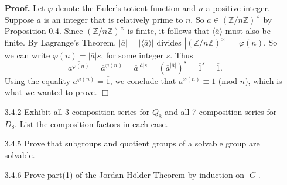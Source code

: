 \documentclass[9pt]{article}
\newcommand{\qed}{\hfill \ensuremath{\Box}}
\newcommand{\cyc}[1]{\langle #1 \rangle}
\newcommand{\Z}{\mathbb{Z}}
\begin{document}
\begin{enumerate}
      \textbf{Proof.} Let $\varphi$ denote the Euler's totient function and $n$
      a positive integer. Suppose $a$ is an integer that is relatively prime to
      $n$. So $\overline{a} \in (\Z/n\Z)^\times$ by Proposition 0.4. Since
      $(\Z/n\Z)^\times$ is finite, it follows that $\cyc{\overline{a}}$ must
      also be finite. By Lagrange's Theorem,
      $|\overline{a}| = |\cyc{\overline{a}}|$ divides
      $|(\Z/n\Z)^\times| = \varphi(n)$. So we can write
      $\varphi(n) = |\overline{a}|s$, for some integer $s$. Thus
      $$\overline{a^{\varphi(n)}} = \overline{a}^{\varphi(n)} =
        \overline{a}^{|\overline{a}|s} = (\overline{a}^{|\overline{a}|})^s =
        \overline{1}^s = \overline{1}.$$
      Using the equality $\overline{a^{\varphi(n)}} = \overline{1}$,
      we conclude that $a^{\varphi(n)} \equiv 1$ (mod $n$), which is what we
      wanted to prove. \qed
   \item[3.4.2]   Exhibit all 3 composition series for $Q_8$ and all 7 
                  composition series for $D_8$. List the composition factors in
                  each case.
   \item[3.4.5]   Prove that subgroups and quotient groups of a solvable group
                  are solvable.
   \item[3.4.6]   Prove part(1) of the Jordan-H\"{o}lder Theorem by induction on
                  $|G|$.
\end{enumerate}
\end{document}
